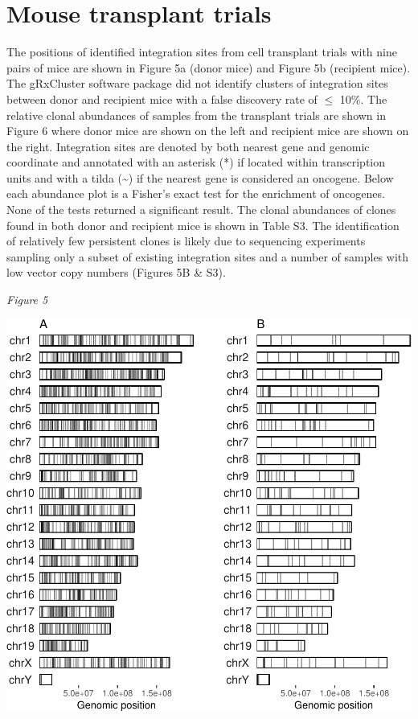 \documentclass[12pt,]{article}
\begin{document}
\newpage

\section{Mouse transplant trials}\label{mouse-transplant-trials}

The positions of identified integration sites from cell transplant
trials with nine pairs of mice are shown in Figure 5a (donor mice) and
Figure 5b (recipient mice). The gRxCluster software package did not
identify clusters of integration sites between donor and recipient mice
with a false discovery rate of \(\leq\) 10\%. The relative clonal
abundances of samples from the transplant trials are shown in Figure 6
where donor mice are shown on the left and recipient mice are shown on
the right. Integration sites are denoted by both nearest gene and
genomic coordinate and annotated with an asterisk (*) if located within
transcription units and with a tilda (\textasciitilde{}) if the nearest
gene is considered an oncogene. Below each abundance plot is a Fisher's
exact test for the enrichment of oncogenes. None of the tests returned a
significant result. The clonal abundances of clones found in both donor
and recipient mice is shown in Table S3. The identification of
relatively few persistent clones is likely due to sequencing experiments
sampling only a subset of existing integration sites and a number of
samples with low vector copy numbers (Figures 5B \& S3).

\emph{Figure 5}

\includegraphics{project_files/figure-latex/transplantSites-1.pdf}
\end{document}
